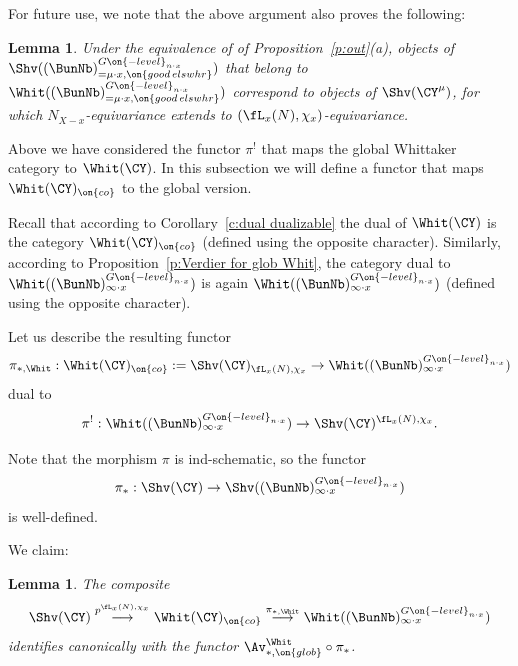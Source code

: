 \documentclass[9pt]{amsart}
\newtheorem{lem}[subsubsection]{Lemma}
\theoremstyle{definition}
\theoremstyle{remark}
\newcommand{\propref}[1]{Proposition~\ref{#1}}
\newcommand{\corref}[1]{Corollary~\ref{#1}}
\numberwithin{equation}{section}
\begin{document}
For future use, we note that the above argument also proves the following:

\begin{lem} \label{l:out bis bis}
Under the equivalence of 
of \propref{p:out}(a), objects of $\Shv((\BunNb)^{G\on{-level}_{n\cdot x}}_{=\mu\cdot x,\on{good\,elswhr}})$
that belong to $\Whit((\BunNb)^{G\on{-level}_{n\cdot x}}_{=\mu\cdot x,\on{good\,elswhr}})$ correspond to objects of 
$\Shv(\CY^\mu)$, for which $N_{X-x}$-equivariance extends to $(\fL_x(N),\chi_x)$-equivariance. 
\end{lem} 


Above we have considered the functor $\pi^!$ that maps the global Whittaker category to $\Whit(\CY)$. In this
subsection we will define a functor that maps $\Whit(\CY)_{\on{co}}$ to the global version. 

\sssec{}

Recall that according to \corref{c:dual dualizable} the dual of $\Whit(\CY)$ is the category $\Whit(\CY)_{\on{co}}$
(defined using the opposite character). Similarly, according to \propref{p:Verdier for glob Whit}, the category dual to 
$\Whit((\BunNb)^{G\on{-level}_{n\cdot x}}_{\infty\cdot x})$ is again $\Whit((\BunNb)^{G\on{-level}_{n\cdot x}}_{\infty\cdot x})$
(defined using the opposite character). 

\medskip

Let us describe the resulting functor
\begin{equation} \label{e:dual functor}
\pi_{*,\Whit}:\Whit(\CY)_{\on{co}}:=\Shv(\CY)_{\fL_x(N),\chi_x}\to \Whit((\BunNb)^{G\on{-level}_{n\cdot x}}_{\infty\cdot x})
\end{equation} 
dual to 
$$\pi^!: \Whit((\BunNb)^{G\on{-level}_{n\cdot x}}_{\infty\cdot x})\to \Shv(\CY)^{\fL_x(N),\chi_x}.$$

\sssec{}

Note that the morphism $\pi$ is ind-schematic, so the functor 
$$\pi_*:\Shv(\CY)\to \Shv((\BunNb)^{G\on{-level}_{n\cdot x}}_{\infty\cdot x})$$
is well-defined.

\medskip

We claim:

\begin{lem} \label{l:dual pi}
The composite
$$\Shv(\CY) \overset{p^{\fL_x(N),\chi_x}} \longrightarrow 
\Whit(\CY)_{\on{co}} \overset{\pi_{*,\Whit}}\longrightarrow \Whit((\BunNb)^{G\on{-level}_{n\cdot x}}_{\infty\cdot x})$$
identifies canonically with the functor $\Av_{*,\on{glob}}^{\Whit}\circ \pi_*$.
\end{lem}
\end{document}
